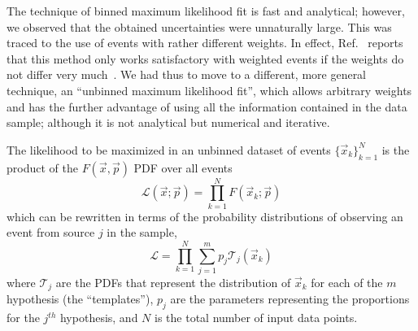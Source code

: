 The technique of binned maximum likelihood fit is fast and analytical; %
however, we observed that the obtained uncertainties were unnaturally large.  This was traced to the use of events with rather different weights. In effect, Ref.~\cite{Barlow1993219} reports that this method only works satisfactory with weighted events if the weights do not differ very much~\cite{Barlow1993219}.
We had thus to move to a different, more general technique, an ``unbinned maximum likelihood fit'',  which allows arbitrary weights and has the further advantage of using all the information contained in the data sample; although it is not analytical but numerical and iterative. 

The likelihood to be maximized in an unbinned dataset of events $\{\vec{x}_k\}^N_{k=1}$ is the product of the $F(\vec{x},\vec{p})$ PDF over all events
%
\begin{equation}
\mathcal{L}(\vec{x};\vec{p}) =\prod^N_{k=1} F(\vec{x}_k;\vec{p})
\end{equation}
%
which can be rewritten in terms of the probability distributions of observing an event from source $j$ in the sample,
%
\begin{equation}
\mathcal{L} =  \prod^N_{k=1} \sum^m_{j=1} p_j  \mathcal{T}_j(\vec{x}_k)
 \label{eq:LLgeneral}
\end{equation}
%
where $\mathcal{T}_j$ are the PDFs that represent the distribution of $\vec{x}_k$ for each of the $m$ hypothesis (the ``templates''), $p_j$ are the parameters representing the proportions for the $j^{th}$ hypothesis, and $N$ is the total number of input data points.


